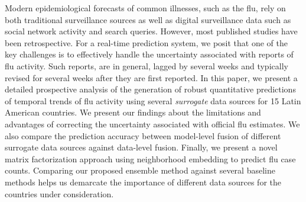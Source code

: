 Modern epidemiological forecasts of
common illnesses, such as the flu, rely on both traditional surveillance
sources as well as digital surveillance data such as social network
activity and search queries. 
However, most published
studies have been retrospective. For a real-time prediction system,
we posit that one of the key challenges is to effectively handle the uncertainty
associated with reports of flu activity.
Such reports, are in general, lagged by several weeks and typically revised
for several weeks after they are first reported. In this paper, 
we present a detailed
prospective analysis of the generation of robust quantitative predictions 
of temporal trends of flu activity using several {\it surrogate} data 
sources for 15 Latin American countries.
We present our findings about the limitations and
advantages of correcting the uncertainty associated with official 
flu estimates. We 
also compare the prediction accuracy between model-level fusion 
of different surrogate data sources
against data-level fusion. Finally, we present a novel matrix factorization 
approach using neighborhood embedding to predict flu case counts. 
Comparing our proposed ensemble method against several baseline
methods helps us demarcate the importance of different data
sources for the countries under consideration.
